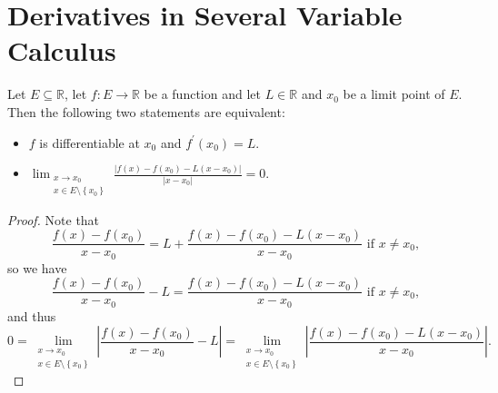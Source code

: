 \section{Derivatives in Several Variable Calculus}

\begin{lemma}
    Let \(E \subseteq \mathbb{R} \), let \(f: E \to \mathbb{R} \) be a function and let \(L \in \mathbb{R} \) and \(x_0\) be a limit point of \(E\). Then the following two statements are equivalent:
    \begin{itemize}
        \item [(a)] \(f\) is differentiable at \(x_0\) and \(f^{\prime} (x_0) = L\). 
        \item [(b)] \(\lim_{\substack{x \to x_0 \\ x \in E \setminus \left\{ x_0 \right\} }}     \frac{\left\vert f(x) - f(x_0) - L(x - x_0) \right\vert }{\vert x - x_0 \vert } = 0\).    
    \end{itemize}     
\end{lemma}
\begin{proof}
    Note that 
    \[
        \frac{f(x) - f(x_0)}{x - x_0} = L + \frac{f(x) - f(x_0) - L(x - x_0)}{x - x_0} \text{ if } x \neq x_0,
    \]
    so we have 
    \[
       \frac{f(x) - f(x_0)}{x - x_0} - L = \frac{f(x) - f(x_0) - L(x - x_0)}{x - x_0} \text{ if } x \neq x_0, 
    \]
    and thus 
    \[
       0 = \lim_{\substack{x \to x_0 \\ x \in E \setminus \left\{ x_0 \right\} }} \left\vert \frac{f(x) - f(x_0)}{x - x_0} - L \right\vert  = \lim_{\substack{x \to x_0 \\ x \in E \setminus \left\{ x_0 \right\} }} \left\vert \frac{f(x) - f(x_0) - L(x - x_0)}{x - x_0} \right\vert. 
    \]
\end{proof}